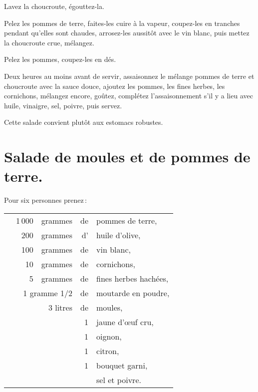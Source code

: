 Lavez la choucroute, égouttez-la.

Pelez les pommes de terre, faites-les cuire à la vapeur, coupez-les en tranches
pendant qu'elles sont chaudes, arrosez-les aussitôt avec le vin blanc, puis mettez
la choucroute crue, mélangez.

Pelez les pommes, coupez-les en dés.

Deux heures au moins avant de servir, assaisonnez le mélange pommes de terre et
choucroute avec la sauce douce, ajoutez les pommes, les fines herbes, les
cornichons, mélangez encore, goûtez, complétez l’assaisonnement s'il y a lieu
avec huile, vinaigre, sel, poivre, puis servez.

Cette salade convient plutôt aux estomacs robustes.

\section*{\centering Salade de moules et de pommes de terre.}
{}

Pour six personnes prenez :

\footnotesize
\begin{longtable}{rrrrp{16em}}
  &   1 000 & grammes & de & pommes de terre,                                                             \\
  &     200 & grammes & d' & huile d'olive,                                                               \\
  &     100 & grammes & de & vin blanc,                                                                   \\
  &      10 & grammes & de & cornichons,                                                                  \\
  &       5 & grammes & de & fines herbes hachées,                                                        \\
  & \multicolumn{2}{r}{1 gramme 1/2} & de & moutarde en poudre,                                           \\
  & \multicolumn{2}{r}{3 litres} & de & moules,                                                           \\
  &         &         &  1 & jaune d'œuf cru,                                                             \\
  &         &         &  1 & oignon,                                                                      \\
  &         &         &  1 & citron,                                                                      \\
  &         &         &  1 & bouquet garni,                                                               \\
  &         &         &    & sel et poivre.                                                               \\
\end{longtable}
\normalsize

